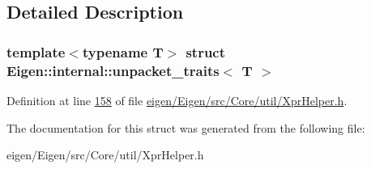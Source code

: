 \subsection{Detailed Description}
\subsubsection*{template$<$typename T$>$\newline
struct Eigen\+::internal\+::unpacket\+\_\+traits$<$ T $>$}



Definition at line \hyperlink{eigen_2_eigen_2src_2_core_2util_2_xpr_helper_8h_source_l00158}{158} of file \hyperlink{eigen_2_eigen_2src_2_core_2util_2_xpr_helper_8h_source}{eigen/\+Eigen/src/\+Core/util/\+Xpr\+Helper.\+h}.



The documentation for this struct was generated from the following file\+:\begin{DoxyCompactItemize}
\item 
eigen/\+Eigen/src/\+Core/util/\+Xpr\+Helper.\+h\end{DoxyCompactItemize}
